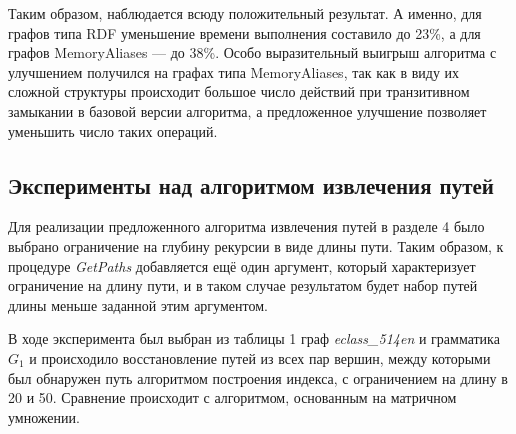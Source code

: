 Таким образом, наблюдается всюду положительный результат. А именно, для графов типа RDF уменьшение времени выполнения составило до 23\%, а для графов MemoryAliases --- до 38\%. Особо выразительный выигрыш алгоритма с улучшением получился на графах типа MemoryAliases, так как в виду их сложной структуры происходит большое число действий при транзитивном замыкании в базовой версии алгоритма, а предложенное улучшение позволяет уменьшить число таких операций.

\subsection{Эксперименты над алгоритмом извлечения путей}

Для реализации предложенного алгоритма извлечения путей в разделе 4 было выбрано ограничение на глубину рекурсии в виде длины пути. Таким образом, к процедуре \textit{GetPaths} добавляется ещё один аргумент, который характеризует ограничение на длину пути, и в таком случае результатом будет набор путей длины меньше заданной этим аргументом.

В ходе эксперимента был выбран из таблицы 1 граф \textit{eclass\_514en} и грамматика $G_1$ и происходило восстановление путей из всех пар вершин, между которыми был обнаружен путь алгоритмом построения индекса, с ограничением на длину в 20 и 50. Сравнение происходит с алгоритмом, основанным на матричном умножении.


